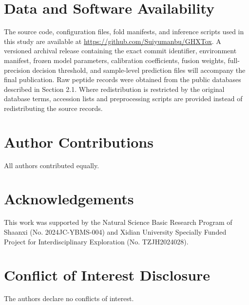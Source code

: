 \documentclass[12pt]{article}
\let\GHXprocessdelayedfloats\processdelayedfloats
\begin{document}
\section*{Data and Software Availability}
The source code, configuration files, fold manifests, and inference scripts
used in this study are available at
\url{https://github.com/Suiyumanbu/GHXTox}. A versioned archival release
containing the exact commit identifier, environment manifest, frozen model
parameters, calibration coefficients, fusion weights, full-precision decision
threshold, and sample-level prediction files will accompany the final
publication.
Raw peptide records were obtained from the public databases described in
Section 2.1. Where redistribution is restricted by the original database
terms, accession lists and preprocessing scripts are provided instead of
redistributing the source records.

\section*{Author Contributions}
All authors contributed equally.

\section*{Acknowledgements}
This work was supported by the Natural Science Basic Research Program of
Shaanxi (No. 2024JC-YBMS-004) and Xidian University Specially Funded Project
for Interdisciplinary Exploration (No. TZJH2024028).

\section*{Conflict of Interest Disclosure}
The authors declare no conflicts of interest.




\clearpage
\pagestyle{empty}
\thispagestyle{empty}
\GHXprocessdelayedfloats
\end{document}
